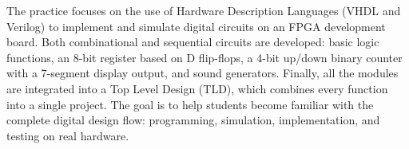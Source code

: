 
The practice focuses on the use of Hardware Description Languages (VHDL and Verilog) to implement and simulate digital circuits on an FPGA development board. Both combinational and sequential circuits are developed: basic logic functions, an 8-bit register based on D flip-flops, a 4-bit up/down binary counter with a 7-segment display output, and sound generators. Finally, all the modules are integrated into a Top Level Design (TLD), which combines every function into a single project. The goal is to help students become familiar with the complete digital design flow: programming, simulation, implementation, and testing on real hardware.